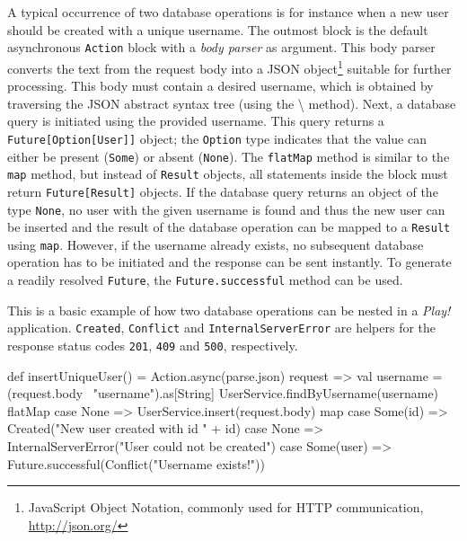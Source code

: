 A typical occurrence of two database operations is for instance when a new user should be created with a unique username. The outmost block is the default asynchronous \texttt{Action} block with a \textit{body parser} as argument. This body parser converts the text from the request body into a JSON  object\footnote{JavaScript Object Notation, commonly used for HTTP communication, \url{http://json.org/}} suitable for further processing. This body must contain a desired username, which is obtained by traversing the JSON abstract syntax tree (using the \textbackslash{} method). Next, a database query is initiated using the provided username. This query returns a \texttt{Future[Option[User]]} object; the \texttt{Option} type indicates that the value can either be present (\texttt{Some}) or absent (\texttt{None}). The \texttt{flatMap} method is similar to the \texttt{map} method, but instead of \texttt{Result} objects, all statements inside the block must return \texttt{Future[Result]} objects. If the database query returns an object of the type \texttt{None}, no user with the given username is found and thus the new user can be inserted and the result of the database operation can be mapped to a \texttt{Result} using \texttt{map}. However, if the username already exists, no subsequent database operation has to be initiated and the response can be sent instantly. To generate a readily resolved \texttt{Future}, the \texttt{Future.successful} method can be used.

\begin{program}
  \caption{This is a basic example of how two database operations can be nested in a \textit{Play!} application. \texttt{Created}, \texttt{Conflict} and \texttt{InternalServerError} are helpers for the response status codes \texttt{201}, \texttt{409} and \texttt{500}, respectively.}
  \label{prog:multimap}
  \begin{JavaCode}
def insertUniqueUser() = Action.async(parse.json) {
    request =>
        val username = (request.body \ "username").as[String]
        UserService.findByUsername(username) flatMap {
            case None =>
                UserService.insert(request.body) map {
                    case Some(id) =>
                        Created("New user created with id " + id)
                    case None =>
                        InternalServerError("User could not be created")
                }
             case Some(user) =>
                Future.successful(Conflict("Username exists!"))
        }
}
  \end{JavaCode}
\end{program}

